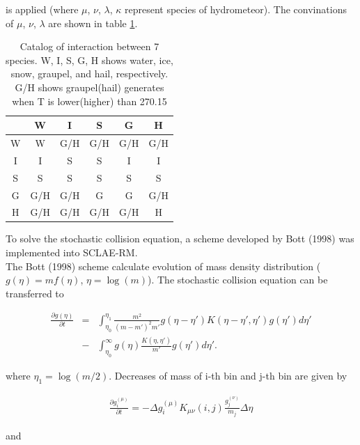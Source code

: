is applied (where $\mu$, $\nu$, $\lambda$, $\kappa$ represent species of hydrometeor). The convinations of $\mu$, $\nu$, $\lambda$ are shown in table \ref{table-s10-1}.

\begin{table}[h]
\begin{center}
\caption{Catalog of interaction between 7 species. W, I, S, G, H shows water, ice, snow, graupel, and hail, respectively. G/H shows graupel(hail) generates when T is lower(higher) than 270.15}
\label{table-s10-1}
\begin{tabular}{cccccc}
\hline
     & W   & I   & S   & G   & H   \\ \hline\hline
W    & W   & G/H & G/H & G/H & G/H \\ \hline
I    & I   & S   & S   & I   & I   \\ \hline
S    & S   & S   & S   & S   & S   \\ \hline
G    & G/H & G/H & G   & G   & G/H \\ \hline
H    & G/H & G/H & G/H & G/H & H   \\ \hline
\end{tabular}
\end{center}
\end{table}


To solve the stochastic collision equation, a scheme developed by Bott (1998)\cite{bott_1998} was implemented into SCLAE-RM.\\
The Bott (1998)\cite{bott_1998} scheme calculate evolution of mass density distribution ($g(\eta)=mf(\eta)$, $\eta=\log(m)$). The stochastic collision equation can be transferred to

\begin{eqnarray}
\frac{\partial g(\eta)}{\partial t}&=&\int_{\eta_{0}}^{\eta_{1}}\frac{m^{2}}{(m-m')^{2} m'}g(\eta-\eta') K(\eta-\eta',\eta')g(\eta')d\eta' \nonumber\\
&-&\int_{\eta_{0}}^{\infty} g(\eta)\frac{K(\eta,\eta')}{m'}g(\eta')d\eta'.\label{s10-17}
\end{eqnarray}

 where $\eta_{1}=\log(m/2)$. Decreases of mass of i-th bin and j-th bin are given by

\begin{eqnarray}
\frac{\partial g_{i}^{(\mu)}}{\partial t}=-\Delta g^{(\mu)}_{i} K_{\mu\nu}(i,j)\frac{g_{j}^{(\nu)}}{m_{j}}\Delta \eta\label{s10-18}
\end{eqnarray}

and


